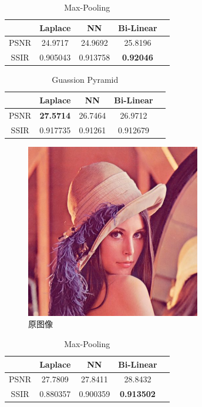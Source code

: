 \documentclass[12pt]{article}
\begin{document}
	\begin{table}[H]
		\centering
		\begin{tabular}{|c|c|c|c|c|}
			\hline
			& Laplace  & NN       & Bi-Linear \\ \hline
			PSNR & 24.9717  & 24.9692  & 25.8196   \\ \hline
			SSIR & 0.905043 & 0.913758 & \textbf{0.92046}   \\ \hline
		\end{tabular}
	\caption{Max-Pooling}
	\label{}
	\end{table}
	
	\begin{table}[H]
		\centering
		\begin{tabular}{|c|c|c|c|c|}
			\hline
			& Laplace  & NN      & Bi-Linear \\ \hline
			PSNR & \textbf{27.5714}  & 26.7464 & 26.9712   \\ \hline
			SSIR & 0.917735 & 0.91261 & 0.912679  \\ \hline
		\end{tabular}
	\caption{Guassion Pyramid}
	\label{}
	\end{table}
	
	\begin{figure}[H]
		\centering
		\includegraphics[width=3in]{./Lena.jpg}
		\centering
		\caption{原图像}
	\end{figure}
		
	\begin{table}[H]
		\centering
		\begin{tabular}{|c|c|c|c|c|}
			\hline
			& Laplace  & NN       & Bi-Linear   \\ \hline
			PSNR & 27.7809  & 27.8411  & 28.8432     \\ \hline
			SSIR & 0.880357 & 0.900359 & \textbf{0.913502}    \\ \hline
		\end{tabular}
	\caption{Max-Pooling}
	\label{}
	\end{table}
	
\end{document}
